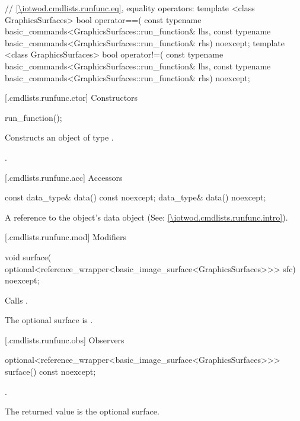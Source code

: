 \begin{codeblock}
{  // \ref{\iotwod.cmdlists.runfunc.eq}, equality operators:
  template <class GraphicsSurfaces>
  bool operator==(
    const typename basic_commands<GraphicsSurfaces::run_function& lhs,
    const typename basic_commands<GraphicsSurfaces::run_function& rhs) 
    noexcept;
  template <class GraphicsSurfaces>
  bool operator!=(
    const typename basic_commands<GraphicsSurfaces::run_function& lhs,
    const typename basic_commands<GraphicsSurfaces::run_function& rhs) 
    noexcept;
}
\end{codeblock}

 [\iotwod.cmdlists.runfunc.ctor] {Constructors}%

%
\begin{itemdecl}
run_function();
\end{itemdecl}
\begin{itemdescr}
\pnum
\effects Constructs an object of type .

\pnum
\postconditions {}.
\end{itemdescr}

 [\iotwod.cmdlists.runfunc.acc] {Accessors}%

%
\begin{itemdecl}
const data_type& data() const noexcept;
data_type& data() noexcept;
\end{itemdecl}
\begin{itemdescr}
\pnum
\returns A reference to the  object's data object (See: \ref{\iotwod.cmdlists.runfunc.intro}).
\end{itemdescr}

 [\iotwod.cmdlists.runfunc.mod] {Modifiers}%

%
\begin{itemdecl}
void surface(
  optional<reference_wrapper<basic_image_surface<GraphicsSurfaces>>> sfc) 
  noexcept;
\end{itemdecl}
\begin{itemdescr}
\pnum
\effects Calls .

\pnum
\remarks The optional surface is .
\end{itemdescr}

 [\iotwod.cmdlists.runfunc.obs] {Observers}%

%
\begin{itemdecl}
optional<reference_wrapper<basic_image_surface<GraphicsSurfaces>>> 
  surface() const noexcept;
\end{itemdecl}
\begin{itemdescr}
\pnum
\returns {}.

\pnum
\remarks
The returned value is the optional surface.
\end{itemdescr}

